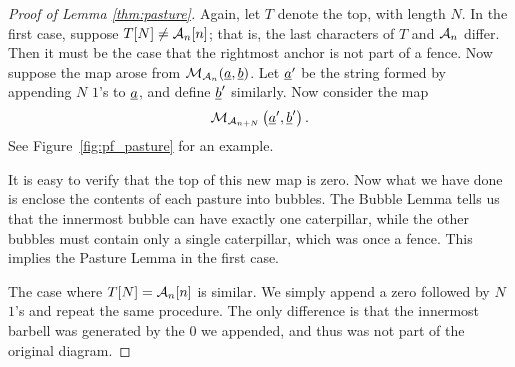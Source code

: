 \begin{proof}[Proof of Lemma \ref{thm:pasture}]
	Again, let $T$ denote the top, with length $N$.  In the first case, suppose $T[N] \neq \AA_n[n]$; that is, the last characters of $T$ and $\AA_n$ differ.  Then it must be the case that the rightmost anchor is not part of a fence.
	Now suppose the map arose from $\MM_{\AA_n}(\ul a, \ul b)$.  Let $\ul a'$ be the string formed by appending $N$ $1$'s to $\ul a$, and define $\ul b'$ similarly.  Now consider the map \[ \MM_{\AA_{n+N}} \left( \ul a', \ul b' \right). \]  See Figure~\ref{fig:pf_pasture} for an example.

	It is easy to verify that the top of this new map is zero.  Now what we have done is enclose the contents of each pasture into bubbles.  The Bubble Lemma tells us that the innermost bubble can have exactly one caterpillar, while the other bubbles must contain only a single caterpillar, which was once a fence.  This implies the Pasture Lemma in the first case.

	The case where $T[N] = \AA_n[n]$ is similar.  We simply append a zero followed by $N$ $1$'s and repeat the same procedure.  The only difference is that the innermost barbell was generated by the $0$ we appended, and thus was not part of the original diagram.
\end{proof}



